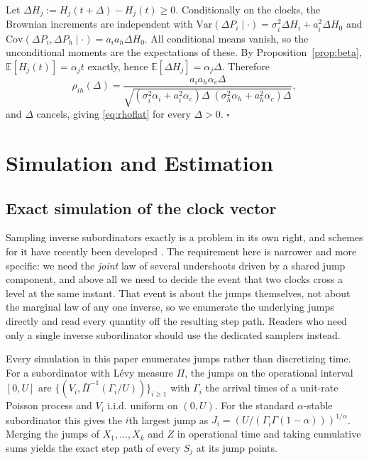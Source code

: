 \documentclass{ws-ijtaf}
\newcommand{\E}{\mathbb{E}}
\providecommand{\qed}{\hfill\ensuremath{\square}}
\begin{document}
Let $\Delta H_j := H_j(t+\Delta)-H_j(t)\ge0$. Conditionally on the clocks, the
Brownian increments are independent with
$\mathrm{Var}(\Delta P_i \mid \cdot) = \sigma_i^2\Delta H_i + a_i^2\Delta H_0$
and $\mathrm{Cov}(\Delta P_i,\Delta P_h \mid \cdot) = a_ia_h\Delta H_0$. All
conditional means vanish, so the unconditional moments are the expectations of
these. By Proposition~\ref{prop:beta}, $\E[H_j(t)]=\alpha_j t$ exactly, hence
$\E[\Delta H_j]=\alpha_j\Delta$. Therefore
\begin{equation}
\rho_{ih}(\Delta) =
\frac{a_ia_h\alpha_c\Delta}
{\sqrt{(\sigma_i^2\alpha_i+a_i^2\alpha_c)\Delta\;
       (\sigma_h^2\alpha_h+a_h^2\alpha_c)\Delta}},
\end{equation}
and $\Delta$ cancels, giving \eqref{eq:rhoflat} for every $\Delta>0$. \qed

\section{Simulation and Estimation}\label{app:numerics}

\subsection*{Exact simulation of the clock vector}

Sampling inverse subordinators exactly is a problem in its own right, and
schemes for it have recently been developed \citep{bio26}. The requirement here
is narrower and more specific: we need the \emph{joint} law of several
undershoots driven by a shared jump component, and above all we need to decide
the event that two clocks cross a level at the same instant. That event is
about the jumps themselves, not about the marginal law of any one inverse, so we
enumerate the underlying jumps directly and read every quantity off the
resulting step path. Readers who need only a single inverse subordinator should
use the dedicated samplers instead.

Every simulation in this paper enumerates jumps rather than discretizing time.
For a subordinator with L\'evy measure $\Pi$, the jumps on the operational
interval $[0,U]$ are $\{(V_i,\bar\Pi^{-1}(\Gamma_i/U))\}_{i\ge1}$ with
$\Gamma_i$ the arrival times of a unit-rate Poisson process and $V_i$ i.i.d.
uniform on $(0,U)$. For the standard $\alpha$-stable subordinator this gives the
$i$th largest jump as $J_i = (U/(\Gamma_i\Gamma(1-\alpha)))^{1/\alpha}$.
Merging the jumps of $X_1,\dots,X_k$ and $Z$ in operational time and taking
cumulative sums yields the exact step path of every $S_j$ at its jump points.
\end{document}
